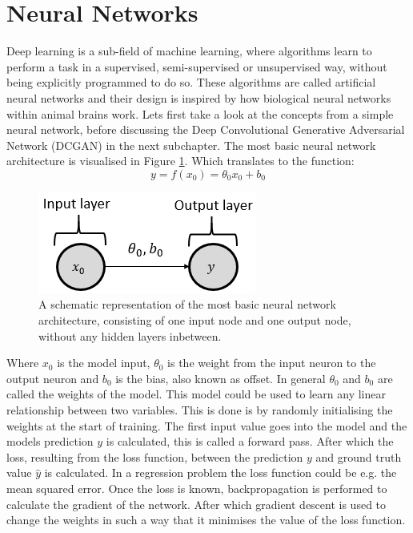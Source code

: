 \section{Neural Networks} \label{neuralnetworks}
Deep learning is a sub-field of machine learning, where algorithms learn to perform a task in a supervised, semi-supervised or unsupervised way, without being explicitly programmed to do so. These algorithms are called artificial neural networks and their design is inspired by how biological neural networks within animal brains work. Lets first take a look at the concepts from a simple neural network, before discussing the Deep Convolutional Generative Adversarial Network (DCGAN) in the next subchapter. The most basic neural network architecture is visualised in Figure \ref{fig:simplednn}. Which translates to the function:
\begin{equation}
    y=f(x_0)=\theta_0 x_0+b_0
\end{equation}

\begin{figure} [!htb]
    \centering
    \includegraphics[scale=0.6]{figuren/fig2.2.1.1.png}
    \caption{A schematic representation of the most basic neural network architecture, consisting of one input node and one output node, without any hidden layers inbetween.}
    \label{fig:simplednn}
\end{figure}

Where $x_0$ is the model input, $\theta_0$ is the weight from the input neuron to the output neuron and $b_0$ is the bias, also known as offset. In general $\theta_0$ and $b_0$ are called the weights of the model. This model could be used to learn any linear relationship between two variables. This is done is by randomly initialising the weights at the start of training. The first input value goes into the model and the models prediction $y$ is calculated, this is called a forward pass. After which the loss, resulting from the loss function, between the prediction $y$ and ground truth value $\hat{y}$ is calculated. In a regression problem the loss function could be e.g. the mean squared error. Once the loss is known, backpropagation is performed to calculate the gradient of the network. After which gradient descent is used to change the weights in such a way that it minimises the value of the loss function. 

